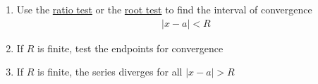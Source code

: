 \documentclass{article}
\begin{document}
\begin{itemize}
\begin{enumerate}

\item
Use the \underline{ratio test} or the \underline{root test} to find the interval of convergence
\begin{gather*}
|x-a|<R
\end{gather*}

\item
If $R$ is finite, test the endpoints for convergence

\item
If $R$ is finite, the series diverges for all $|x-a|>R$

\end{enumerate}

\end{itemize}
\end{document}
